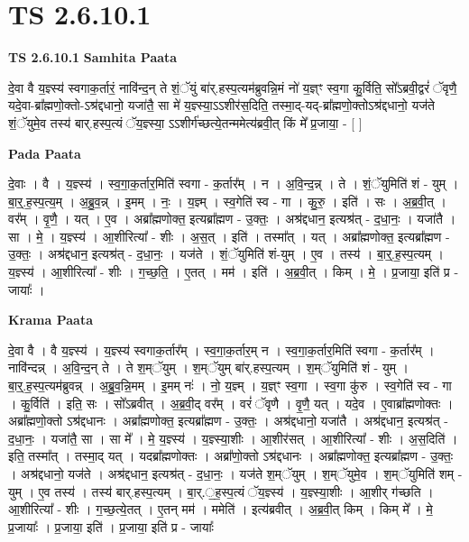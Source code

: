 \documentclass[17pt]{extarticle}
\begin{document}
\section{ TS 2.6.10.1 }

\textbf{TS 2.6.10.1 } \newline
\textbf{Samhita Paata} \newline

दे॒वा वै य॒ज्ञ्स्य॑ स्वगाक॒र्तारं॒ नावि॑न्द॒न् ते शं॒ॅयुं बा॑र्.हस्प॒त्यम॑ब्रुवन्नि॒मं नो॑ य॒ज्ञ्ꣳ स्व॒गा कु॒र्विति॒ सो᳚ऽब्रवी॒द्वरं॑ ॅवृणै॒ यदे॒वा-ब्रा᳚ह्मणो॒क्तो-ऽश्र॑द्दधानो॒ यजा॑तै॒ सा मे॑ य॒ज्ञ्स्या॒ऽऽशीर॑स॒दिति॒ तस्मा॒द्-यद्-ब्रा᳚ह्मणो॒क्तोऽश्र॑द्दधानो॒ यज॑ते शं॒ॅयुमे॒व तस्य॑ बार्.हस्प॒त्यं ॅय॒ज्ञ्स्या॒ ऽऽशीर्ग॑च्छत्ये॒तन्ममेत्य॑ब्रवी॒त् किं मे᳚ प्र॒जाया॒ - [  ] \newline

\textbf{Pada Paata} \newline

दे॒वाः । वै । य॒ज्ञ्स्य॑ । स्व॒गा॒क॒र्तार॒मिति॑ स्वगा - क॒र्तार᳚म् । न । अ॒वि॒न्द॒न्न् । ते । शं॒ॅयुमिति॑ शं - युम् । बा॒र्॒.ह॒स्प॒त्य॒म् । अ॒ब्रु॒व॒न्न् । इ॒मम् । नः॒ । य॒ज्ञ्म् । स्व॒गेति॑ स्व - गा । कु॒रु॒ । इति॑ । सः । अ॒ब्र॒वी॒त् । वर᳚म् । वृ॒णै॒ । यत् । ए॒व । अब्रा᳚ह्मणोक्त॒ इत्यब्रा᳚ह्मण - उ॒क्तः॒ । अश्र॑द्दधान॒ इत्यश्र॑त् - द॒धा॒नः॒ । यजा॑तै । सा । मे॒ । य॒ज्ञ्स्य॑ । आ॒शीरित्या᳚ - शीः । अ॒स॒त् । इति॑ । तस्मा᳚त् । यत् । अब्रा᳚ह्मणोक्त॒ इत्यब्रा᳚ह्मण - उ॒क्तः॒ । अश्र॑द्दधान॒ इत्यश्र॑त् - द॒धा॒नः॒ । यज॑ते । शं॒ॅयुमिति॑ शं-युम् । ए॒व । तस्य॑ । बा॒र्॒.ह॒स्प॒त्यम् । य॒ज्ञ्स्य॑ । आ॒शीरित्या᳚ - शीः । ग॒च्छ॒ति॒ । ए॒तत् । मम॑ । इति॑ । अ॒ब्र॒वी॒त् । किम् । मे॒ । प्र॒जाया॒ इति॑ प्र - जायाः᳚ ।  \newline


\textbf{Krama Paata} \newline

दे॒वा वै । वै य॒ज्ञ्स्य॑ । य॒ज्ञ्स्य॑ स्वगाक॒र्तार᳚म् । स्व॒गा॒क॒र्तार॒म् न । स्व॒गा॒क॒र्तार॒मिति॑ स्वगा - क॒र्तार᳚म् । नावि॑न्दन्न् । अ॒वि॒न्द॒न् ते । ते श॒म्ॅयुम् । श॒म्ॅयुम् बा॑र्.हस्प॒त्यम् । श॒म्ॅयुमिति॑ शं - युम् । बा॒र्॒.ह॒स्प॒त्यम॑ब्रुवन्न् । अ॒ब्रु॒व॒न्नि॒मम् । इ॒मम् नः॑ । नो॒ य॒ज्ञ्म् । य॒ज्ञ्ꣳ स्व॒गा । स्व॒गा कु॑रु । स्व॒गेति॑ स्व - गा । कु॒र्विति॑ । इति॒ सः । सो᳚ऽब्रवीत् । अ॒ब्र॒वी॒द् वर᳚म् । वरं॑ ॅवृणै । वृ॒णै॒ यत् । यदे॒व । ए॒वाब्रा᳚ह्मणोक्तः । अब्रा᳚ह्मणो॒क्तो ऽश्र॑द्दधानः । अब्रा᳚ह्मणोक्त॒ इत्यब्रा᳚ह्मण - उ॒क्तः॒ । अश्र॑द्दधानो॒ यजा॑तै । अश्र॑द्दधान॒ इत्यश्र॑त् - द॒धा॒नः॒ । यजा॑तै॒ सा । सा मे᳚ । मे॒ य॒ज्ञ्स्य॑ । य॒ज्ञ्स्या॒शीः । आ॒शीर॑सत् । आ॒शीरित्या᳚ - शीः । अ॒स॒दिति॑ । इति॒ तस्मा᳚त् । तस्मा॒द् यत् । यदब्रा᳚ह्मणोक्तः । अब्रा᳚णो॒क्तो ऽश्र॑द्दधानः । अब्रा᳚ह्मणोक्त॒ इत्यब्रा᳚ह्मण - उ॒क्तः॒ । अश्र॑द्दधानो॒ यज॑ते । अश्र॑द्दधान॒ इत्यश्र॑त् - द॒धा॒नः॒ । यज॑ते श॒म्ॅयुम् । श॒म्ॅयुमे॒व । श॒म्ॅयुमिति॑ शम् - युम् । ए॒व तस्य॑ । तस्य॑ बार्.हस्प॒त्यम् । बा॒र्.॒ह॒स्प॒त्यं ॅय॒ज्ञ्स्य॑ । य॒ज्ञ्स्या॒शीः । आ॒शीर् ग॑च्छति । आ॒शीरित्या᳚ - शीः । ग॒च्छ॒त्ये॒तत् । ए॒तन् मम॑ । ममेति॑ । इत्य॑ब्रवीत् । अ॒ब्र॒वी॒त् किम् । किम् मे᳚ । मे॒ प्र॒जायाः᳚ । प्र॒जाया॒ इति॑ । प्र॒जाया॒ इति॑ प्र - जायाः᳚ \newline
\end{document}
